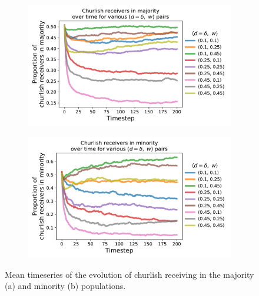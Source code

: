 \documentclass[11pt,letterpaper]{article}
\begin{document}
\begin{figure}[H]
  \centering
  \begin{subfigure}{0.49\textwidth}
    \centering
    \includegraphics[width=\textwidth]{prelim/Figures/churlish_series_majority.pdf}
    \caption{}
    \label{fig:}
  \end{subfigure}
  \begin{subfigure}{0.49\textwidth}
    \centering
    \includegraphics[width=\textwidth]{prelim/Figures/churlish_series_minority.pdf}
    \caption{}
    \label{fig:}
  \end{subfigure}
  \caption{Mean timeseries of the evolution of churlish receiving in the
    majority (a) and minority (b) populations.}
  \label{fig:regressions}
\end{figure}
\end{document}
